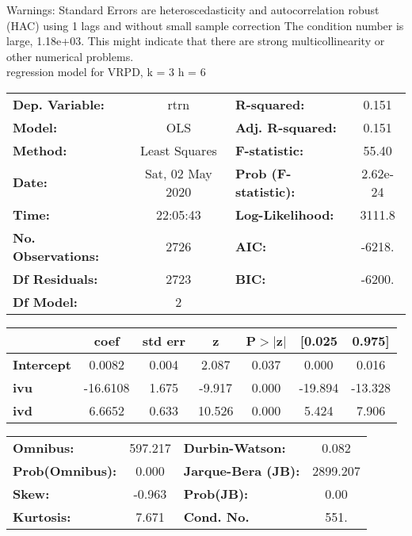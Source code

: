 Warnings: \newline
 [1] Standard Errors are heteroscedasticity and autocorrelation robust (HAC) using 1 lags and without small sample correction \newline
 [2] The condition number is large, 1.18e+03. This might indicate that there are \newline
 strong multicollinearity or other numerical problems.\\ 

regression model for VRPD, k = 3 h = 6\begin{center}
\begin{tabular}{lclc}
\toprule
\textbf{Dep. Variable:}    &       rtrn       & \textbf{  R-squared:         } &     0.151   \\
\textbf{Model:}            &       OLS        & \textbf{  Adj. R-squared:    } &     0.151   \\
\textbf{Method:}           &  Least Squares   & \textbf{  F-statistic:       } &     55.40   \\
\textbf{Date:}             & Sat, 02 May 2020 & \textbf{  Prob (F-statistic):} &  2.62e-24   \\
\textbf{Time:}             &     22:05:43     & \textbf{  Log-Likelihood:    } &    3111.8   \\
\textbf{No. Observations:} &        2726      & \textbf{  AIC:               } &    -6218.   \\
\textbf{Df Residuals:}     &        2723      & \textbf{  BIC:               } &    -6200.   \\
\textbf{Df Model:}         &           2      & \textbf{                     } &             \\
\bottomrule
\end{tabular}
\begin{tabular}{lcccccc}
                   & \textbf{coef} & \textbf{std err} & \textbf{z} & \textbf{P$> |$z$|$} & \textbf{[0.025} & \textbf{0.975]}  \\
\midrule
\textbf{Intercept} &       0.0082  &        0.004     &     2.087  &         0.037        &        0.000    &        0.016     \\
\textbf{ivu}       &     -16.6108  &        1.675     &    -9.917  &         0.000        &      -19.894    &      -13.328     \\
\textbf{ivd}       &       6.6652  &        0.633     &    10.526  &         0.000        &        5.424    &        7.906     \\
\bottomrule
\end{tabular}
\begin{tabular}{lclc}
\textbf{Omnibus:}       & 597.217 & \textbf{  Durbin-Watson:     } &    0.082  \\
\textbf{Prob(Omnibus):} &   0.000 & \textbf{  Jarque-Bera (JB):  } & 2899.207  \\
\textbf{Skew:}          &  -0.963 & \textbf{  Prob(JB):          } &     0.00  \\
\textbf{Kurtosis:}      &   7.671 & \textbf{  Cond. No.          } &     551.  \\
\bottomrule
\end{tabular}
\end{center}

